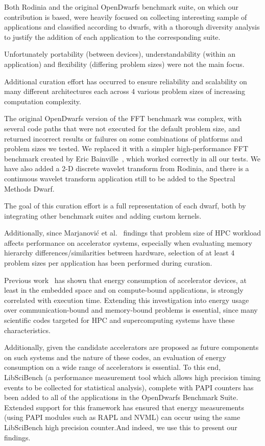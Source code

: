 \documentclass[../document.tex]{subfiles}
\begin{document}
\label{sec:extending_the_opendwarfs_benchmark_suite}

Both Rodinia and the original OpenDwarfs benchmark suite, on which our contribution is based, were heavily focused on collecting interesting sample of applications and classified according to dwarfs, with a thorough diversity analysis to justify the addition of each application to the corresponding suite.

Unfortunately portability (between devices), understandability (within an application) and flexibility (differing problem sizes) were not the main focus.

Additional curation effort has occurred to ensure reliability and scalability on many different architectures each across 4 various problem sizes of increasing computation complexity.

The original OpenDwarfs version of the FFT benchmark was complex, with several code paths that were not executed for the default problem size, and returned incorrect results or failures on some combinations of platforms and problem sizes we tested.
We replaced it with a simpler high-performance FFT benchmark created by Eric Bainville~\cite{bainville2010fft}, which worked correctly in all our tests.
We have also added a 2-D discrete wavelet transform from Rodinia, and there is a continuous wavelet transform application still to be added to the Spectral Methods Dwarf.

The goal of this curation effort is a full representation of each dwarf, both by integrating other benchmark suites and adding custom kernels.

Additionally, since Marjanovi\'{c} et al.~\cite{marjanovic2016hpc} findings that problem size of HPC workload affects performance on accelerator systems, especially when evaluating memory hierarchy differences/similarities between hardware, selection of at least 4 problem sizes per application has been performed during curation.

Previous work~\cite{johnston2017embedded} has shown that energy consumption of accelerator devices, at least in the embedded space and on compute-bound applications, is strongly correlated with execution time.
Extending this investigation into energy usage over communication-bound and memory-bound problems is essential, since many scientific codes targeted for HPC and supercomputing systems have these characteristics.

Additionally, given the candidate accelerators are proposed as future components on such systems and the nature of these codes, an evaluation of energy consumption on a wide range of accelerators is essential.
To this end, LibSciBench (a performance measurement tool which allows high precision timing events to be collected for statistical analysis), complete with PAPI counters has been added to all of the applications in the OpenDwarfs Benchmark Suite.
Extended support for this framework has ensured that energy measurements (using PAPI modules such as RAPL and NVML) can occur using the same LibSciBench high precision counter.And indeed, we use this to present our findings.
\end{document}
